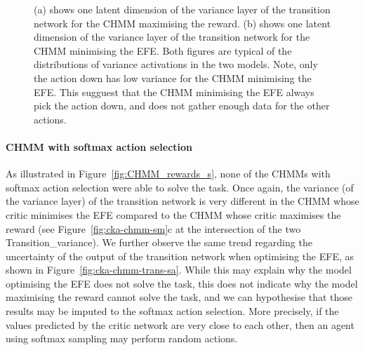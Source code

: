 \documentclass[twoside,11pt]{article}
\begin{document}
\begin{figure}[H]
    \caption{(a) shows one latent dimension of the variance layer of the transition network for the CHMM maximising the reward. (b) shows one latent dimension of the variance layer of the transition network for the CHMM minimising the EFE. Both figures are typical of the distributions of variance activations in the two models. Note, only the action down has low variance for the CHMM minimising the EFE. This sugguest that the CHMM minimising the EFE always pick the action down, and does not gather enough data for the other actions.
    }
    \label{fig:cka-chmm-trans-ba}
\end{figure}

\paragraph{CHMM with softmax action selection}
As illustrated in Figure~\ref{fig:CHMM_rewards_s}, none of the CHMMs with softmax action selection were able to solve the task. Once again, the variance (of the variance layer) of the transition network is very different in the CHMM whose critic minimises the EFE compared to the CHMM whose critic maximises the reward (see Figure~\ref{fig:cka-chmm-sm}c at the intersection of the two Transition\_variance). We further observe the same trend regarding the uncertainty of the output of the transition network when optimising the EFE, as shown in Figure~\ref{fig:cka-chmm-trans-sa}. While this may explain why the model optimising the EFE does not solve the task, this does not indicate why the model maximising the reward cannot solve the task, and we can hypothesise that those results may be imputed to the softmax action selection. More precisely, if the values predicted by the critic network are very close to each other, then an agent using softmax sampling may perform random actions.
\end{document}
